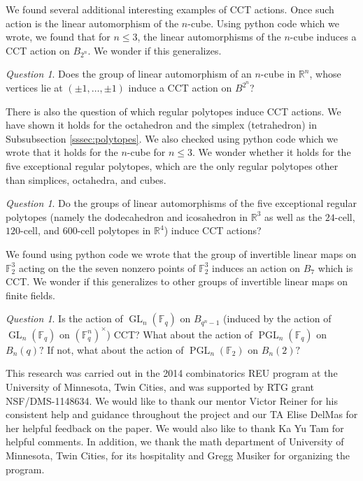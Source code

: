 \documentclass[smallextended, envcountsame, numbook]{svjour3}
\theoremstyle{plain}
\theoremstyle{definition}
\theoremstyle{remark}
\newtheorem{que}[thm]{Question}
\numberwithin{equation}{section}
\begin{document}
We found several additional interesting examples of CCT actions. Once such action is the linear automorphism of the $n$-cube. Using python code which we wrote, we found that for $n \leq 3$, the linear automorphisms of the $n$-cube induces a CCT action on $B_{2^n}$. We wonder if this generalizes.

\begin{que}
\label{question:cube_cct}
Does the group of linear automorphism of an $n$-cube in $\mathbb R^n$, whose vertices lie at $(\pm 1, \ldots, \pm 1)$ induce a CCT action on $B^{2^n}$?
\end{que}

There is also the question of which regular polytopes induce CCT actions. We have shown it holds for the octahedron and the simplex (tetrahedron) in Subsubsection \ref{sssec:polytopes}. We also checked using python code which we wrote that it holds for the $n$-cube for $n \leq 3$. We wonder whether it holds for the five exceptional regular polytopes, which are the only regular polytopes other than simplices, octahedra, and cubes.

\begin{que}
\label{question:exceptional_polytopes_cct}
Do the groups of linear automorphisms of the five exceptional regular polytopes (namely the dodecahedron and icosahedron in $\mathbb R^3$ as well as the $24$-cell, $120$-cell, and $600$-cell polytopes in $\mathbb R^4$) induce CCT actions?
\end{que}

We found using python code we wrote that the group of invertible linear maps on $\mathbb F_2^3$ acting on the the seven nonzero points of $\mathbb F_2^3$ induces an action on $B_7$ which is CCT. We wonder if this generalizes to other groups of invertible linear maps on finite fields.

\begin{que}
Is the action of $\operatorname{GL}_n(\mathbb F_q)$ on $B_{q^n-1}$ (induced by the action of $\operatorname{GL}_n(\mathbb F_q)$ on $(\mathbb F_q^n)^\times$) CCT? What about the action of $\operatorname{PGL}_n(\mathbb F_q)$ on $B_n(q)?$ If not, what about the action of $\operatorname{PGL}_n(\mathbb F_2)$ on $B_n(2)?$ 
\end{que}

\begin{acknowledgements}
This research was carried out in the 2014 combinatorics REU program at the University of Minnesota, Twin Cities, and was supported by RTG grant NSF/DMS-1148634.
We would like to thank our mentor Victor Reiner for his consistent help and guidance throughout the project and our TA Elise DelMas for her helpful feedback on the paper. We would also like to thank Ka Yu Tam for helpful comments.  In addition, we thank the math department of University of Minnesota, Twin Cities, for its hospitality and Gregg Musiker for organizing the program.
\end{acknowledgements}
\end{document}
